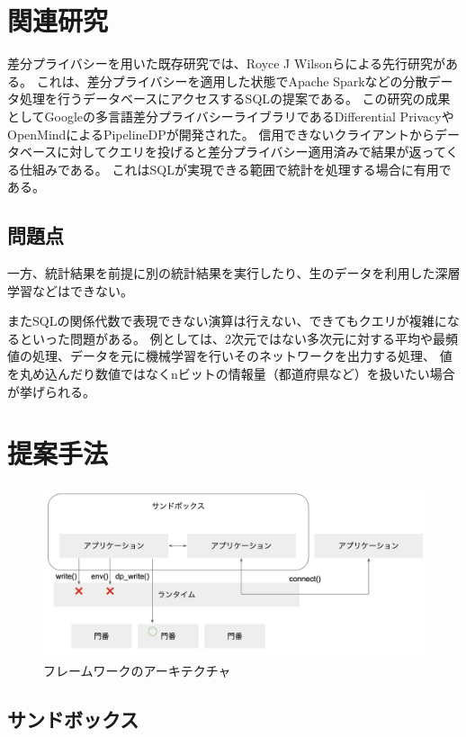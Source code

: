 \documentclass[a4paper,11pt]{jreport}
\begin{document}
\section{関連研究}

差分プライバシーを用いた既存研究では、Royce J Wilsonらによる先行研究がある。
これは、差分プライバシーを適用した状態でApache Sparkなどの分散データ処理を行うデータベースにアクセスするSQLの提案である。
この研究の成果としてGoogleの多言語差分プライバシーライブラリであるDifferential PrivacyやOpenMindによるPipelineDPが開発された。
信用できないクライアントからデータベースに対してクエリを投げると差分プライバシー適用済みで結果が返ってくる仕組みである。
これはSQLが実現できる範囲で統計を処理する場合に有用である。

\subsection{問題点}

一方、統計結果を前提に別の統計結果を実行したり、生のデータを利用した深層学習などはできない。

またSQLの関係代数で表現できない演算は行えない、できてもクエリが複雑になるといった問題がある。
例としては、2次元ではない多次元に対する平均や最頻値の処理、データを元に機械学習を行いそのネットワークを出力する処理、
値を丸め込んだり数値ではなくnビットの情報量（都道府県など）を扱いたい場合が挙げられる。

\section{提案手法}

\begin{figure}[htbp]
    \centering
\includegraphics[height=50mm]{architecture.png}
    \caption{フレームワークのアーキテクチャ}
    \label{fig:architecture}
\end{figure}

\subsection{サンドボックス}
\end{document}
